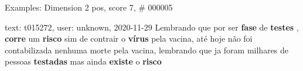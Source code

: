 \begin{frame}{Examples: Dimension 2 pos, score 7, \# 000005}
\footnotesize
\begin{exampleblock}{text: t015272, user: unknown, 2020-11-29}
Lembrando que por ser \textbf{fase} de \textbf{testes} , \textbf{corre} um 
\textbf{risco} sim de contrair o \textbf{vírus} pela vacina, até hoje não foi 
contabilizada nenhuma morte pela vacina, lembrando que ja foram milhares de 
pessoas \textbf{testadas} mas ainda \textbf{existe} o \textbf{risco} 
\end{exampleblock}
\end{frame}
